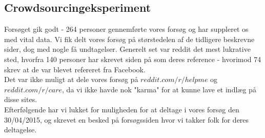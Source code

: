\subsection*{Crowdsourcingeksperiment}
Forsøget gik godt - 264 personer gennemførte vores forsøg og har suppleret os med vital data. Vi fik delt vores forsøg på størstedelen af de tidligere beskrevne sider, dog med nogle få undtagelser. Generelt set var reddit det mest lukrative sted, hvorfra 140 personer har skrevet siden på som deres reference - hvorimod 74 skrev at de var blevet refereret fra Facebook.\\
Det var ikke muligt at dele vores forsøg på $reddit.com/r/helpme$ og $reddit.com/r/care$, da vi ikke havde nok "karma" for at kunne lave et indlæg på disse sites.\\
Efterfølgende har vi lukket for muligheden for at deltage i vores forsøg den 30/04/2015, og skrevet en besked på forsøgssiden hvor vi takker folk for deres deltagelse.

